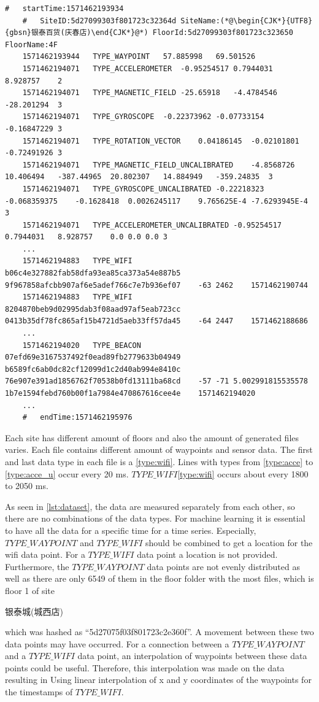 \begin{lstlisting}[caption={A snippet of a file from the dataset},label={lst:dataset},captionpos=b]
    #	startTime:1571462193934
    #	SiteID:5d27099303f801723c32364d	SiteName:(*@\begin{CJK*}{UTF8}{gbsn}银泰百货(庆春店)\end{CJK*}@*) FloorId:5d27099303f801723c323650	FloorName:4F
    1571462193944	TYPE_WAYPOINT	57.885998	69.501526
    1571462194071	TYPE_ACCELEROMETER	-0.95254517	0.7944031	8.928757	2
    1571462194071	TYPE_MAGNETIC_FIELD	-25.65918	-4.4784546	-28.201294	3
    1571462194071	TYPE_GYROSCOPE	-0.22373962	-0.07733154	-0.16847229	3
    1571462194071	TYPE_ROTATION_VECTOR	0.04186145	-0.02101801	-0.72491926	3
    1571462194071	TYPE_MAGNETIC_FIELD_UNCALIBRATED	-4.8568726	10.406494	-387.44965	20.802307	14.884949	-359.24835	3
    1571462194071	TYPE_GYROSCOPE_UNCALIBRATED	-0.22218323	-0.068359375	-0.1628418	0.0026245117	9.765625E-4	-7.6293945E-4	3
    1571462194071	TYPE_ACCELEROMETER_UNCALIBRATED	-0.95254517	0.7944031	8.928757	0.0	0.0	0.0	3
    ...
    1571462194883	TYPE_WIFI	b06c4e327882fab58dfa93ea85ca373a54e887b5	9f967858afcbb907af6e5adef766c7e7b936ef07	-63	2462	1571462190744
    1571462194883	TYPE_WIFI	8204870beb9d02995dab3f08aad97af5eab723cc	0413b35df78fc865af15b4721d5aeb33ff57da45	-64	2447	1571462188686
    ...
    1571462194020	TYPE_BEACON	07efd69e3167537492f0ead89fb2779633b04949	b6589fc6ab0dc82cf12099d1c2d40ab994e8410c	76e907e391ad1856762f70538b0fd13111ba68cd	-57	-71	5.002991815535578	1b7e1594febd760b00f1a7984e470867616cee4e	1571462194020
    ...
    #	endTime:1571462195976
\end{lstlisting}

Each site has different amount of floors and also the amount of generated files varies.
Each file contains different amount of waypoints and sensor data.
The first and last data type in each file is a \ref{type:wifi}.
Lines with types from \ref{type:acce} to \ref{type:acce_u} occur every 20 ms.
\(TYPE\_WIFI\)\ref{type:wifi} occurs about every 1800 to 2050 ms.

As seen in \cref{lst:dataset}, the data are measured separately from each other, so there are no combinations of the data types.
For machine learning it is essential to have all the data for a specific time for a time series.
Especially, \(TYPE\_WAYPOINT\) and \(TYPE\_WIFI\) should be combined to get a location for the \ac{wifi} data point.
For a \(TYPE\_WIFI\) data point a location is not provided.
Furthermore, the \(TYPE\_WAYPOINT\) data points are not evenly distributed as well as there are only 6549 of them in the floor folder with the most files, which is floor 1 of site \begin{CJK*}{UTF8}{gbsn}银泰城(城西店)\end{CJK*} which was hashed as ``5d27075f03f801723c2e360f''.
A movement between these two data points may have occurred.
For a connection between a \(TYPE\_WAYPOINT\) and a \(TYPE\_WIFI\) data point, an interpolation of waypoints between these data points could be useful.
Therefore, this interpolation was made on the data resulting in 
Using linear interpolation of x and y coordinates of the waypoints for the timestamps of \(TYPE\_WIFI\).

